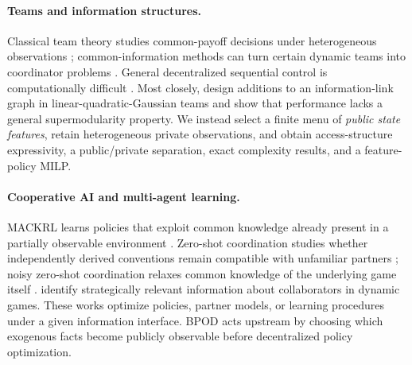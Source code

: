 \paragraph{Teams and information structures.}
Classical team theory studies common-payoff decisions under heterogeneous observations \cite{Radner1962,MarschakRadner1972,HoChu1972,Witsenhausen1971}; common-information methods can turn certain dynamic teams into coordinator problems \cite{NayyarEtAl2013}. General decentralized sequential control is computationally difficult \cite{BernsteinEtAl2002,OliehoekAmato2016}. Most closely, \citet{SummersEtAl2017} design additions to an information-link graph in linear-quadratic-Gaussian teams and show that performance lacks a general supermodularity property. We instead select a finite menu of \emph{public state features}, retain heterogeneous private observations, and obtain access-structure expressivity, a public/private separation, exact complexity results, and a feature-policy MILP.

\paragraph{Cooperative AI and multi-agent learning.}
MACKRL learns policies that exploit common knowledge already present in a partially observable environment \cite{SchroederEtAl2019}. Zero-shot coordination studies whether independently derived conventions remain compatible with unfamiliar partners \cite{HuEtAl2020,TreutleinEtAl2021}; noisy zero-shot coordination relaxes common knowledge of the underlying game itself \cite{AnwarEtAl2024}. \citet{LaufferEtAl2023} identify strategically relevant information about collaborators in dynamic games. These works optimize policies, partner models, or learning procedures under a given information interface. BPOD acts upstream by choosing which exogenous facts become publicly observable before decentralized policy optimization.

